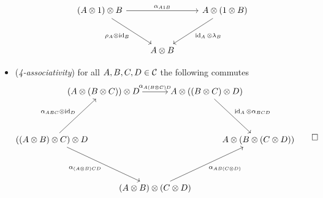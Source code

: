 \begin{definition}
\begin{itemize}
                    \begin{equation*}
                        \begin{tikzcd}[row sep=3em]
                            (A\otimes 1)\otimes B \arrow[dr, swap, "\rho_A\otimes\id_B"] \arrow[rr, "\alpha_{A1B}"] & & A\otimes(1\otimes B) \arrow[dl, "\id_A\otimes\lambda_B"]\\
                             & A\otimes B &
                        \end{tikzcd}
                    \end{equation*}
                \item (\emph{4-associativity}) for all $A,B,C,D\in\mathcal{C}$ the following commutes
                    \begin{equation*}
                        \begin{tikzcd}[column sep=-3em, row sep=4em, cramped]
                            & (A\otimes(B\otimes C))\otimes D \arrow[rr, "\alpha_{A(B\otimes C)D}"] & & A\otimes((B\otimes C)\otimes D) \arrow[dr, "\id_A\otimes\alpha_{BCD}"] &\\
                            ((A\otimes B)\otimes C)\otimes D \arrow[ur, "\alpha_{ABC}\otimes\id_D"] \arrow[drr, "\alpha_{(A\otimes B)CD}", swap] & & & & A\otimes(B\otimes(C\otimes D)) \\
                             & & (A\otimes B)\otimes(C\otimes D) \arrow[urr, "\alpha_{AB(C\otimes D)}", swap] & &
                        \end{tikzcd}\qedhere
                    \end{equation*}
            \end{itemize}
        \end{definition}

